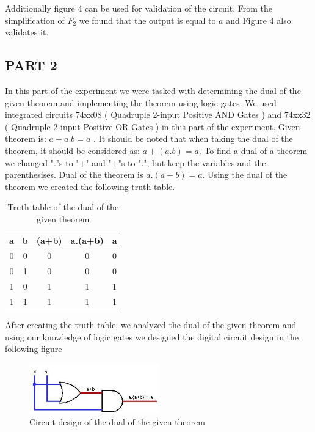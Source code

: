 \documentclass[pdftex,12pt,a4paper]{article}
\begin{document}
Additionally figure 4 can be used for validation of the circuit. From the simplification of $F_{2}$ we found that the output is equal to $a$ and Figure 4 also validates it. 

\subsection{PART 2}
In this part of the experiment we were tasked with determining the dual of the given theorem and implementing the theorem using logic gates. We used integrated circuits 74xx08 ( Quadruple 2-input Positive AND Gates ) and 74xx32 ( Quadruple 2-input Positive OR Gates ) in this part of the experiment.
Given theorem is: $a + a.b = a$ . It should be noted that when taking the dual of the theorem, it should be considered as: $ a + (a.b) = a $. To find a dual of a theorem we changed "."s to "+" and "+"s to ".", but keep the variables and the parenthesises.
\newline
Dual of the theorem is $a.(a+b) = a$. Using the dual of the theorem we created the following truth table.

\begin{table}[H]
\centering
\begin{tabular}{|c|c|c|c|c|}
\hline
a & b & (a+b) & a.(a+b)  & a      \\ \hline
0 & 0 & 0 & 0       & 0        \\ 
0 & 1 & 0 & 0       & 0        \\ 
1 & 0 & 1 & 1       & 1        \\ 
1 & 1 & 1 & 1       & 1        \\  \hline
\end{tabular}
\caption{Truth table of the dual of the given theorem}
\label{Table 3}
\end{table}

After creating the truth table, we analyzed the dual of the given theorem and using our knowledge of logic gates we designed the digital circuit design in the following figure

\begin{figure}[H]
	\centering
	\includegraphics[width=0.5\textwidth]{E2P2.1.1.jpg}
	\caption{Circuit design of the dual of the given theorem}
	\label{Figure 5}
\end{figure}
\end{document}
